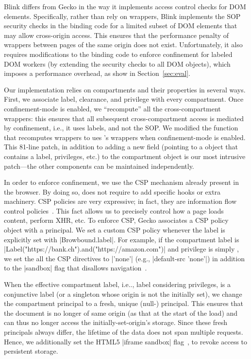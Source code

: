 Blink differs from Gecko in the way it implements access control checks for
DOM elements. 
%
Specifically, rather than rely on wrappers, Blink implements the SOP security
checks in the binding code for a limited subset of DOM elements that may allow
cross-origin access.
%
This ensures that the performance penalty of wrappers between pages of the same
origin does not exist.
%
Unfortunately, it also requires modifications to the binding code to enforce
confinement for labeled DOM workers (by extending the security checks to all
DOM objects), which imposes a  performance overhead, as show in
Section~\ref{sec:eval}.

Our implementation relies on compartments and their properties in
several ways.
%
First, we associate label, clearance, and privilege with every 
compartment.
%
Once confinement-mode is enabled, we ``recompute'' all the
cross-compartment wrappers: this ensures that all subsequent
cross-compartment access is mediated by confinement, i.e., it uses
labels, and not the SOP. %
%
We modified the function that recomputes wrappers to ues \sys{}'s
wrappers when confinement-mode is enabled.
%
This 81-line patch, in addition to adding a new field (pointing to a \sys{}
object that contains a label, privileges, etc.) to the compartment
object is our most intrusive patch---the other \sys{} components can be
maintained independently.
 
%
In order to enforce confinement, we use the CSP mechanism already present 
in the browser. 
By doing so, \sys{} does not require to add specific hooks or extra machinery. 
CSP policies are very expressive; in fact, they are
information flow control policies~\cite{yang:2013:towards}. This fact allows us
to precisely control how a page loads content, perform XHR, etc.
To enforce CSP, Gecko associates a CSP policy object with a principal.
%
We set a custom CSP policy whenever the label is
explicitly set with \js|Browbound.label|.
%
For example, if the compartment label is
\js|Label("https://bank.ch").and("https://amazon.com")| and privilege
is simply , we set the all the CSP directives to
\js|'none'| (e.g., \js|default-src 'none'|) in addition to the
\js|sandbox| flag that disallows
navigation~\cite{csp1.1,whatwg-html,html5}.
%

When the effective compartment label, i.e.., label considering privileges, is
a conjunctive label (or a singleton whose origin is not the initially set), 
we change the compartment principal to a fresh, unique (null-)
principal. 
%
This ensures that the document is no longer of same origin (as that
at the start of the load) and can thus no longer access the
initially-set-origin's storage.
%
Since these fresh principals always differ, the lifetime of the data does not
span multiple requests.
%
Hence, we additionally set the HTML5 \js|iframe sandbox| flag~\cite{html5},
to revoke access to persistent storage.


